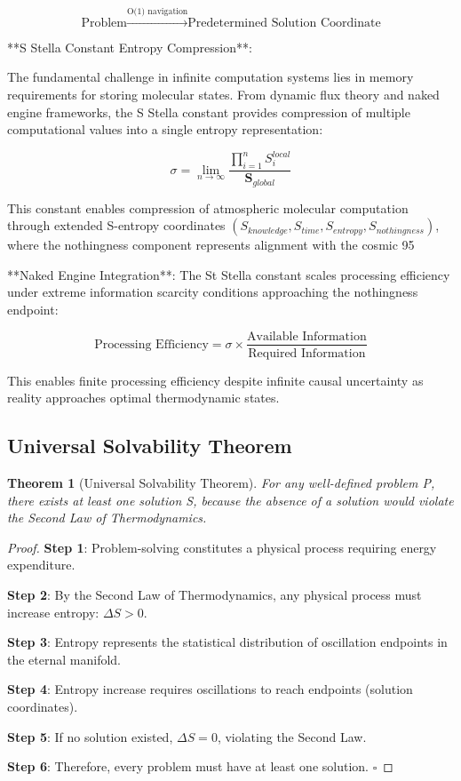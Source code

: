 \documentclass[12pt,a4paper]{article}
\newtheorem{theorem}{Theorem}[section]
\theoremstyle{remark}
\begin{document}
\begin{equation}
\text{Problem} \xrightarrow{\text{O(1) navigation}} \text{Predetermined Solution Coordinate}
\end{equation}

**S Stella Constant Entropy Compression**:

The fundamental challenge in infinite computation systems lies in memory requirements for storing molecular states. From dynamic flux theory and naked engine frameworks, the S Stella constant provides compression of multiple computational values into a single entropy representation:

\begin{equation}
\sigma = \lim_{n \to \infty} \frac{\prod_{i=1}^{n} S_i^{local}}{\mathbf{S}_{global}}
\end{equation}

This constant enables compression of atmospheric molecular computation through extended S-entropy coordinates $(S_{knowledge}, S_{time}, S_{entropy}, S_{nothingness})$, where the nothingness component represents alignment with the cosmic 95%

**Naked Engine Integration**: The St Stella constant scales processing efficiency under extreme information scarcity conditions approaching the nothingness endpoint:

\begin{equation}
\text{Processing Efficiency} = \sigma \times \frac{\text{Available Information}}{\text{Required Information}}
\end{equation}

This enables finite processing efficiency despite infinite causal uncertainty as reality approaches optimal thermodynamic states.

\subsection{Universal Solvability Theorem}

\begin{theorem}[Universal Solvability Theorem]
For any well-defined problem P, there exists at least one solution S, because the absence of a solution would violate the Second Law of Thermodynamics.
\end{theorem}

\begin{proof}
\textbf{Step 1}: Problem-solving constitutes a physical process requiring energy expenditure.

\textbf{Step 2}: By the Second Law of Thermodynamics, any physical process must increase entropy: $\Delta S > 0$.

\textbf{Step 3}: Entropy represents the statistical distribution of oscillation endpoints in the eternal manifold.

\textbf{Step 4}: Entropy increase requires oscillations to reach endpoints (solution coordinates).

\textbf{Step 5}: If no solution existed, $\Delta S = 0$, violating the Second Law.

\textbf{Step 6}: Therefore, every problem must have at least one solution. $\square$
\end{proof}
\end{document}
